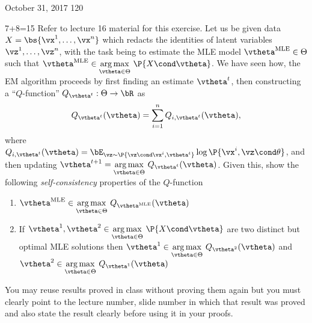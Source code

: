 \documentclass[a4paper,11pt]{article}
\begin{document}
           {October 31, 2017}      			           		%
					 {120}																				%

\newcommand{\rf}{f_{\text{\textsf ReLU}}}

\begin{mlproblem}{7+8=15} Refer to lecture 16 material for this exercise. Let us be given data $X = \bs{\vx^1,\ldots,\vx^n}$ which redacts the identities of latent variables $\vz^1,\ldots,\vz^n$, with the task being to estimate the MLE model $\vtheta^{\text{MLE}} \in \Theta$ such that $\vtheta^{\text{MLE}} \in \underset{\vtheta \in \Theta}{\arg\max}\ \P{X\cond\vtheta}$. We have seen how, the EM algorithm proceeds by first finding an estimate $\vtheta^t$, then constructing a ``$Q$-function'' $Q_{\vtheta^t}: \Theta \rightarrow \bR$ as
\[
Q_{\vtheta^t}(\vtheta) = \sum_{i=1}^n Q_{i,\vtheta^t}(\vtheta),
\]
where $Q_{i,\vtheta^t}(\vtheta) = \bE_{\vz \sim \P{\vz\cond\vx^i,\vtheta^t}}\log \P{\vx^i,\vz\cond\theta}$, and then updating $\vtheta^{t+1} = \underset{\vtheta \in \Theta}{\arg\max}\ Q_{\vtheta^t}(\vtheta)$. Given this, show the following \emph{self-consistency} properties of the $Q$-function
\begin{enumerate}
	\item $\vtheta^{\text{MLE}} \in \underset{\vtheta \in \Theta}{\arg\max}\ Q_{\vtheta^{\text{MLE}}}(\vtheta)$
	\item If $\vtheta^1, \vtheta^2 \in \underset{\vtheta \in \Theta}{\arg\max}\ \P{X\cond\vtheta}$ are two distinct but optimal MLE solutions then $\vtheta^1 \in \underset{\vtheta \in \Theta}{\arg\max}\ Q_{\vtheta^2}(\vtheta)$ and  $\vtheta^2 \in \underset{\vtheta \in \Theta}{\arg\max}\ Q_{\vtheta^1}(\vtheta)$
\end{enumerate}
You may reuse results proved in class without proving them again but you must clearly point to the lecture number, slide number in which that result was proved and also state the result clearly before using it in your proofs.
\end{mlproblem}
\end{document}
